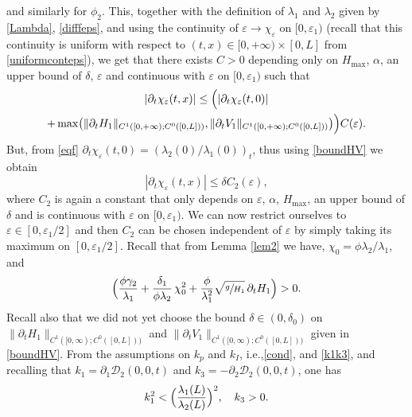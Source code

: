 \documentclass[11pt]{article}
\newcommand{\ie}{i.e.,\xspace}
\numberwithin{equation}{section}
\let\mathcal\mathscr
\theoremstyle{definition}
\begin{document}
and similarly for $\phi_{2}$. This, together with the definition of $\lambda_{1}$ and $\lambda_{2}$ given by \eqref{Lambda}, \eqref{difffeps}, and
using the continuity of $\varepsilon\to \chi_{\varepsilon}$ on $[0,\varepsilon_{1})$ (recall that this continuity is uniform with respect to $(t,x)\in[0,+\infty)\times[0,L]$ {from \eqref{uniformconteps}}),
we get that there exists $C>0$ depending only on $H_{\max}$, $\alpha$, {an upper bound of $\delta$,} $\varepsilon$ and continuous with $\varepsilon$ on $[0,\varepsilon_{1})$ such that\vspace*{-5pt}
\begin{multline*}
|\partial_{t}\chi_{\varepsilon}(t,x)|\leq \Bigl(|\partial_{t}\chi_{\varepsilon}(t,0)|\\
+ \max \bigl(\lVert\partial_{t}H_{1}\rVert_{C^{1}([0,+\infty);C^{0}([0,L]))},\lVert\partial_{t}V_{1}\rVert_{C^{1}([0,+\infty);C^{0}([0,L]))} \bigr) \Bigr)C(\varepsilon).
\end{multline*}
But, from \eqref{eqf} $\partial_{t}\chi_{\varepsilon}(t,0)=\left(\lambda_{2}{(0)}/\lambda_{1}{(0)}\right)_{t}$, thus
using \eqref{boundHV}
we obtain
\begin{equation}
|\partial_{t}\chi_{\varepsilon}(t,x)|\leq \delta C_{2}(\varepsilon),
\label{borne_dtfeps}
\end{equation}
where $C_{2}$ is again a constant that only depends on $\varepsilon$, $\alpha$, $H_{\max}$, {an upper bound of $\delta$} and is continuous with $\varepsilon$ on $[0,\varepsilon_{1})$.
We can now restrict ourselves to $\varepsilon\in[0,\varepsilon_{1}/2]$ and then $C_{2}$ can be chosen independent of $\varepsilon$ by simply taking its maximum on $[0,\varepsilon_{1}/2]$.
Recall that from Lemma \ref{lem2} we have, $\chi_{0}=\phi\lambda_{2}/\lambda_{1}$, and
\begin{equation*}
\Bigl(\frac{\phi\gamma_{2}}{\lambda_{1}}+\frac{\delta_{1}}{\phi\lambda_{2}}\,\chi_{0}^{2}+{\frac{\phi}{\lambda_{1}^{2}}}\sqrt{\sfrac{g}{H_{1}}}\,\partial_{t} H_{1} \Bigr)>0.
\end{equation*}
Recall {also} that we did not yet choose the bound $\delta\in(0,{\delta_{0}})$ on $\lVert\partial_{t}H_{1}\rVert_{C^{1}([0,\infty);C^{0}([0,L]))}$ and $\lVert\partial_{t}V_{1}\rVert_{C^{1}([0,\infty);C^{0}([0,L]))}$ given in \eqref{boundHV}.
From the assumptions on $k_{p}$ and $k_{I}$, \ie \eqref{cond}, and \eqref{k1k3}, {and recalling that $k_{1}=\partial_{1}\mathcal{D}_{2}(0,0,t)$
and $k_{3}=-\partial_{2}\mathcal{D}_{2}(0,0,t)$}, one has
\begin{equation}
k_{1}^{2}<\Bigl(\frac{\lambda_{1}(L)}{\lambda_{2}(L)} \Bigr)^{2},\quad k_{3}>0.
\label{condk1k3}
\end{equation}
\end{document}
